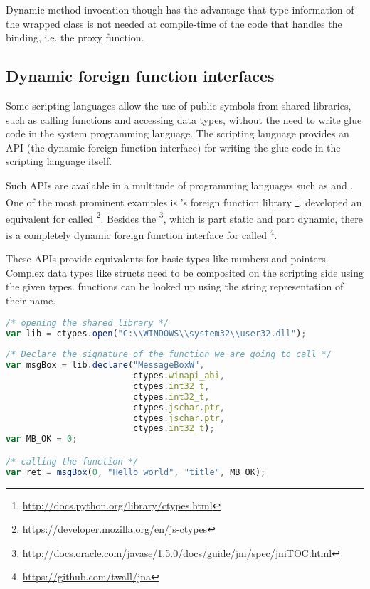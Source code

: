 Dynamic method invocation though has the advantage that type information of the wrapped class is not needed at compile-time of the code that handles the binding, i.e. the proxy function.


\subsection{Dynamic foreign function interfaces}
\label{sec:DynamicFFI}

Some scripting languages allow the use of public symbols from shared libraries, such as calling functions and accessing data types, without the need to write glue code in the system programming language. The scripting language provides an API (the dynamic foreign function interface) for writing the glue code in the scripting language itself.

Such APIs are available in a multitude of programming languages such as  and . One of the most prominent examples is 's foreign function library \footnote{\url{http://docs.python.org/library/ctypes.html}}.  developed an equivalent for  called \footnote{\url{https://developer.mozilla.org/en/js-ctypes}}. Besides the \footnote{\url{http://docs.oracle.com/javase/1.5.0/docs/guide/jni/spec/jniTOC.html}}, which is part static and part dynamic, there is a completely dynamic foreign function interface for  called \footnote{\url{https://github.com/twall/jna}}.

These APIs provide equivalents for basic  types like numbers and pointers. Complex data types like structs need to be composited on the scripting side using the given types.  functions can be looked up using the string representation of their name.

\SingleSpacing
\begin{lstlisting}[language=JavaScript, caption={Exposing a \myProperName{C} function to \myProperName{JavaScript} using \myProperName{js-ctypes}}]
/* opening the shared library */
var lib = ctypes.open("C:\\WINDOWS\\system32\\user32.dll");  
  
/* Declare the signature of the function we are going to call */  
var msgBox = lib.declare("MessageBoxW",  
                         ctypes.winapi_abi,  
                         ctypes.int32_t,  
                         ctypes.int32_t,  
                         ctypes.jschar.ptr,  
                         ctypes.jschar.ptr,  
                         ctypes.int32_t);  
var MB_OK = 0;  

/* calling the function */
var ret = msgBox(0, "Hello world", "title", MB_OK); 
\end{lstlisting}
\OnehalfSpacing

